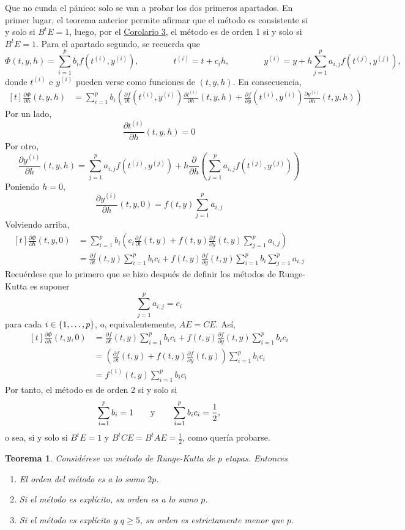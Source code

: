 \documentclass[11pt]{report}
\makeatletter
\renewenvironment{proof}[1][\proofname]{\par
  \pushQED{\qed}%
  \normalfont \topsep\z@skip %
  \trivlist
  \item[\hskip\labelsep
        \itshape
    #1\@addpunct{.}]\ignorespaces
}{%
  \popQED\endtrivlist\@endpefalse
}
\theoremstyle{mytheorem}
\newtheorem{theorem}{Teorema}
\theoremstyle{mydefinition}
\theoremstyle{myexample}
\let\oldproofname=\proofname
\renewcommand{\proofname}{\rm\bf{\oldproofname}}}
\newenvironment{ctheorem} %
  {\begin{mdframed}[
        linewidth=3pt,
        linecolor=c2,
        bottomline=false,
        topline=false,
        rightline=false,
        innerrightmargin=0pt,
        innertopmargin=0pt,
        innerbottommargin=0pt,
        innerleftmargin=1em, %
        skipabove=\baselineskip]
    \begin{theorem}}
  {\end{theorem}\end{mdframed}}
\newcommand{\pars}[1]{\left( #1 \right)}
\newcommand{\pder}[3][2]{\frac{\partial #2}{\partial #3}}
\makeatother
\begin{document}
\vspace{\parskip}

\begin{proof}
Que no cunda el pánico: solo se van a probar los dos primeros apartados.
En primer lugar, el teorema anterior permite afirmar que el método es consistente si y solo si $B^tE = 1$, luego, por el \hyperref[cor3]{\color{gray}Corolario 3}, el método es de orden 1 si y solo si $B^tE=1$. Para el apartado segundo, se recuerda que
\[\Phi(t,y,h) = \sum_{i=1}^p b_if(t^{(i)},y^{(i)}), \qquad \qquad t^{(i)}=t+c_ih, \qquad \qquad y^{(i)} = y+h\sum_{j=1}^p a_{i,j}f(t^{(j)},y^{(j)}),\]
donde $t^{(i)}$ e $y^{(i)}$ pueden verse como funciones de $(t,y,h)$. En consecuencia,
\[
\begin{aligned}[t]
    \pder{\Phi}{h}(t,y,h) &= \sum_{i=1}^p b_i\pars{\pder{f}{t}(t^{(i)},y^{(i)})\pder{t^{(i)}}{h}(t,y,h)+\pder{f}{y}(t^{(i)},y^{(i)})\pder{y^{(i)}}{h}(t,y,h)}
\end{aligned}
\]
Por un lado,
\[\pder{t^{(i)}}{h}(t,y,h) = 0\]
Por otro,
\[\pder{y^{(i)}}{h}(t,y,h) = \sum_{j=1}^pa_{i,j}f(t^{(j)},y^{(j)})+h\frac{\partial}{\partial h}\pars{\sum_{j=1}^pa_{i,j}f(t^{(j)},y^{(j)})}\]
Poniendo $h= 0$,
\[\pder{y^{(i)}}{h}(t,y,0) = f(t,y)\sum_{j=1}^pa_{i,j}\]
Volviendo arriba,
\[
\begin{aligned}[t]
    \pder{\Phi}{h}(t,y,0) &= \sum_{i=1}^p b_i\pars{c_i\pder{f}{t}(t,y)+f(t,y)\pder{f}{y}(t,y)\sum_{j=1}^pa_{i,j}} \\
    &=  \pder{f}{t}(t,y)\sum_{i=1}^p b_ic_i+f(t,y)\pder{f}{y}(t,y)\sum_{i=1}^p b_i\sum_{j=1}^pa_{i,j}
\end{aligned}
\]
Recuérdese que lo primero que se hizo después de definir los métodos de Runge-Kutta es suponer
\[\sum_{j=1}^pa_{i,j} = c_i\]
para cada $i \in \{1,\mathellipsis,p\}$, o, equivalentemente, $AE=CE$. Así,
\[
\begin{aligned}[t]
    \pder{\Phi}{h}(t,y,0) &= \pder{f}{t}(t,y)\sum_{i=1}^p b_ic_i+f(t,y)\pder{f}{y}(t,y)\sum_{i=1}^p b_ic_i \\ &= \pars{\pder{f}{t}(t,y)+f(t,y)\pder{f}{y}(t,y)}\sum_{i=1}^pb_ic_i \\ &= f^{(1)}(t,y)\sum_{i=1}^pb_ic_i
\end{aligned}
\]
Por tanto, el método es de orden 2 si y solo si 
\[\sum_{i=1}^p b_i = 1 \qquad \textup{y} \qquad \sum_{i=1}^p b_ic_i = \frac{1}{2},\]
o sea, si y solo si $B^tE = 1$ y $B^tCE = B^tAE = \frac{1}{2}$, como quería probarse.
\end{proof}
\begin{ctheorem}
Considérese un método de Runge-Kutta de $p$ etapas. Entonces
\begin{enumerate}
    \item El orden del método es a lo sumo $2p$.
    \item Si el método es explícito, su orden es a lo sumo $p$.
    \item Si el método es explícito y $q \geq 5$, su orden es estrictamente menor que $p$.
\end{enumerate}
\end{ctheorem}
\end{document}
